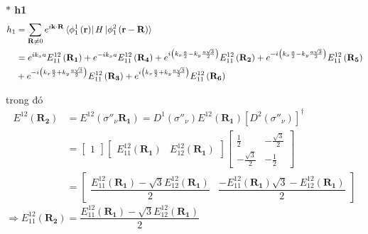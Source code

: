 \documentclass{article}
\begin{document}
\textbf{ $\ast$ h1}
\begin{align}
    h_1 & = \sum_{\mathbf{R} \neq 0} e^{i\mathbf{k\cdot R}} \bra*{\phi_1^1 \left(\mathbf{r}\right)} H \ket*{\phi_1^2\left(\mathbf{r}-\mathbf{R}\right)}\nonumber                                                                                                                                                                        \\
        & = e^{i k_x a} E_{11}^{12}\left(\mathbf{R_1}\right) + e^{-i k_x a} E_{11}^{12}\left(\mathbf{R_4}\right) + e^{i \left( k_x \frac{a}{2} - k_y \frac{a\sqrt{3}}{2} \right)} E_{11}^{12}\left(\mathbf{R_2}\right) + e^{-i \left( k_x \frac{a}{2} - k_y \frac{a\sqrt{3}}{2} \right)} E_{11}^{12}\left(\mathbf{R_5}\right) \nonumber \\
        & + e^{-i \left( k_x \frac{a}{2} + k_y \frac{a\sqrt{3}}{2} \right)} E_{11}^{12}\left(\mathbf{R_3}\right) + e^{i \left( k_x \frac{a}{2} + k_y \frac{a\sqrt{3}}{2} \right)} E_{11}^{12}\left(\mathbf{R_6}\right) \nonumber
\end{align}

trong đó
\begin{align}
    E^{12}(\mathbf{R_2})
     & = E^{12}(\sigma''_\nu \mathbf{R_1}) = D^1(\sigma''_\nu) E^{12}(\mathbf{R_1}) \left[ D^2(\sigma''_\nu)\right]^\dagger \nonumber                                                                                                                                                                                    \\
     & = \begin{bmatrix}
             1
         \end{bmatrix}
    \begin{bmatrix}
        E_{11}^{12}(\mathbf{R_1}) & E_{12}^{12}(\mathbf{R_1})
    \end{bmatrix}
    \begin{bmatrix}
        \frac{1}{2}         & -\frac{\sqrt{3}}{2} \\
        -\frac{\sqrt{3}}{2} & -\frac{1}{2}
    \end{bmatrix} \nonumber                                                                                                                                                                                                                                                             \\
     & = \begin{bmatrix}
             \dfrac{ E_{11}^{12}(\mathbf{R_1}) - \sqrt{3} E_{12}^{12}(\mathbf{R_1})}{2} & \dfrac{ - E_{11}^{12}(\mathbf{R_1})\sqrt{3} -  E_{12}^{12}(\mathbf{R_1})}{2}
         \end{bmatrix}
    \nonumber
\end{align}
$\Rightarrow E_{11}^{12}(\mathbf{R_2}) =  \dfrac{ E_{11}^{12}(\mathbf{R_1}) - \sqrt{3} E_{12}^{12}(\mathbf{R_1})}{2} $
\end{document}
